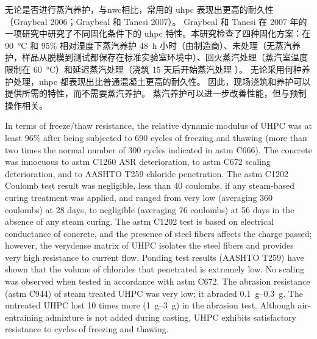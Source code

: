 无论是否进行蒸汽养护，与\acrlong*{nwc}相比，常用的 \gls*{uhpc} 表现出更高的耐久性（Graybeal 2006；Graybeal 和 Tanesi 2007）。 Graybeal 和 Tanesi 在 2007 年的一项研究中研究了不同固化条件下的 \gls*{uhpc} 特性。本研究检查了四种固化方案：在 \qty{90}{\celsius} 和 95\% 相对湿度下蒸汽养护 \qty{48}{h} 小时（由制造商）、未处理（无蒸汽养护，样品从脱模到测试都保存在标准实验室环境中）、回火蒸汽处理（蒸汽室温度限制在 \qty{60}{\celsius}）和延迟蒸汽处理（浇筑 15 天后开始蒸汽处理 ）。 无论采用何种养护处理，\gls*{uhpc} 都表现出比普通混凝土更高的耐久性。 因此，现场浇筑和养护可以提供所需的特性，而不需要蒸汽养护。 蒸汽养护可以进一步改善性能，但与预制操作相关。

In terms of freeze/thaw resistance, the relative dynamic modulus of UHPC was at least 96\% after being subjected to 690 cycles of freezing and thawing (more than two times the normal number of 300 cycles indicated in \acrshort*{astm} C666). The concrete was innocuous to \acrshort*{astm} C1260 ASR deterioration, to \acrshort*{astm} C672 scaling deterioration, and to AASHTO T259 chloride penetration. The \acrshort*{astm} C1202 Coulomb test result was negligible, less than 40 coulombs, if any steam-based curing treatment was applied, and ranged from very low (averaging 360 coulombs) at 28 days, to negligible (averaging 76 coulombs) at 56 days in the absence of any steam curing. The \acrshort*{astm} C1202 test is based on electrical conductance of concrete, and the presence of steel fibers affects the charge passed; however, the verydense matrix of UHPC isolates the steel fibers and provides very high resistance to current flow. Ponding test results (AASHTO T259) have shown that the volume of chlorides that penetrated is extremely low. No scaling was observed when tested in accordance with \acrshort*{astm} C672. The abrasion resistance (\acrshort*{astm} C944) of steam treated UHPC was very low; it abraded \qtyrange{0.1}{0.3}{g}. The untreated UHPC lost 10 times more (\qtyrange{1}{3}{g}) in the abrasion test. Although air-entraining admixture is not added during casting, UHPC exhibits satisfactory resistance to cycles of freezing and thawing.

